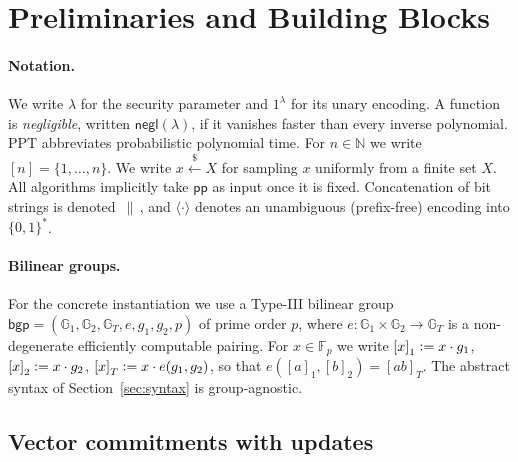 \documentclass[version=submission]{iacrcc}
\theoremstyle{definition}
\newcommand{\secpar}{\lambda}
\newcommand{\negl}{\mathsf{negl}}
\newcommand{\PPT}{\mathrm{PPT}}
\newcommand{\bit}{\{0,1\}}
\newcommand{\sample}{\xleftarrow{\;\$\;}}
\newcommand{\defeq}{\vcentcolon=}
\newcommand{\concat}{\,\|\,}
\newcommand{\pp}{\mathsf{pp}}
\newcommand{\GG}{\mathbb{G}}
\newcommand{\FF}{\mathbb{F}}
\newcommand{\gone}[1]{\left[#1\right]_{1}}
\newcommand{\gtwo}[1]{\left[#1\right]_{2}}
\newcommand{\gtt}[1]{\left[#1\right]_{T}}
\begin{document}
\section{Preliminaries and Building Blocks}\label{sec:prelim}

\paragraph{Notation.}
We write $\secpar$ for the security parameter and $1^\secpar$ for its unary
encoding. A function is \emph{negligible}, written $\negl(\secpar)$, if it
vanishes faster than every inverse polynomial. $\PPT$ abbreviates probabilistic
polynomial time. For $n\in\mathbb{N}$ we write $[n]=\{1,\dots,n\}$. We write
$x\sample X$ for sampling $x$ uniformly from a finite set $X$. All algorithms
implicitly take $\pp$ as input once it is fixed. Concatenation of bit strings is
denoted $\concat$, and $\langle\cdot\rangle$ denotes an unambiguous (prefix-free)
encoding into $\bit^{*}$.

\paragraph{Bilinear groups.}
For the concrete instantiation we use a Type-III bilinear group
$\mathsf{bgp}=(\GG_1,\GG_2,\GG_T,e,g_1,g_2,p)$ of prime order $p$, where
$e:\GG_1\times\GG_2\to\GG_T$ is a non-degenerate efficiently computable pairing.
For $x\in\FF_p$ we write $\gone{x}\defeq x\cdot g_1$, $\gtwo{x}\defeq x\cdot g_2$,
$\gtt{x}\defeq x\cdot e(g_1,g_2)$, so that $e(\gone{a},\gtwo{b})=\gtt{ab}$. The
abstract syntax of Section~\ref{sec:syntax} is group-agnostic.

\subsection{Vector commitments with updates}
\end{document}
